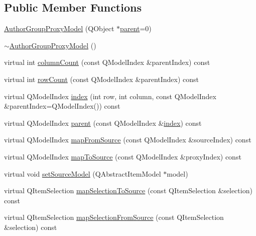 \subsection*{Public Member Functions}
\begin{DoxyCompactItemize}
\item 
\hyperlink{classAuthorGroupProxyModel_ab6d01002fb3a0b42948fc10f5e11a81f}{Author\+Group\+Proxy\+Model} (Q\+Object $\ast$\hyperlink{classAuthorGroupProxyModel_a2181f546bce987d19d5dfa674d0a3f20}{parent}=0)
\item 
\hyperlink{classAuthorGroupProxyModel_a0fa10fec1eb07a0dd34d1def3bf5ab1b}{$\sim$\+Author\+Group\+Proxy\+Model} ()
\item 
virtual int \hyperlink{classAuthorGroupProxyModel_a195f127c68cbcb8d4f01742b043cbe1f}{column\+Count} (const Q\+Model\+Index \&parent\+Index) const 
\item 
virtual int \hyperlink{classAuthorGroupProxyModel_a28c3adc3ed27a3a872550a268332244e}{row\+Count} (const Q\+Model\+Index \&parent\+Index) const 
\item 
virtual Q\+Model\+Index \hyperlink{classAuthorGroupProxyModel_ad8d58393bf0db883b0d725656680d465}{index} (int row, int column, const Q\+Model\+Index \&parent\+Index=Q\+Model\+Index()) const 
\item 
virtual Q\+Model\+Index \hyperlink{classAuthorGroupProxyModel_a2181f546bce987d19d5dfa674d0a3f20}{parent} (const Q\+Model\+Index \&\hyperlink{classAuthorGroupProxyModel_ad8d58393bf0db883b0d725656680d465}{index}) const 
\item 
virtual Q\+Model\+Index \hyperlink{classAuthorGroupProxyModel_a370febf4010a36480218fa450f66a46f}{map\+From\+Source} (const Q\+Model\+Index \&source\+Index) const 
\item 
virtual Q\+Model\+Index \hyperlink{classAuthorGroupProxyModel_aec6dbf0f65bf6970efa8b3642f744f1f}{map\+To\+Source} (const Q\+Model\+Index \&proxy\+Index) const 
\item 
virtual void \hyperlink{classAuthorGroupProxyModel_a674a68de70e314b094db30b46b28e6bd}{set\+Source\+Model} (Q\+Abstract\+Item\+Model $\ast$model)
\item 
virtual Q\+Item\+Selection \hyperlink{classAuthorGroupProxyModel_a7b9716530434c9235202708992de202c}{map\+Selection\+To\+Source} (const Q\+Item\+Selection \&selection) const 
\item 
virtual Q\+Item\+Selection \hyperlink{classAuthorGroupProxyModel_a3e40948a98819df6c7466f4ed779a856}{map\+Selection\+From\+Source} (const Q\+Item\+Selection \&selection) const 

\end{DoxyCompactItemize}
